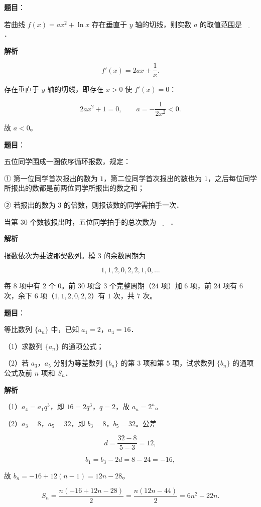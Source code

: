 \begin{answer}

\textbf{题目}：

若曲线 $f(x)=ax^2+\ln x$ 存在垂直于 $y$ 轴的切线，则实数 $a$ 的取值范围是$\underline{\qquad}$．

\textbf{解析}

\nopagebreak[4]
\[f'(x)=2ax+\frac1x.\]

存在垂直于 $y$ 轴的切线，即存在 $x>0$ 使 $f'(x)=0$：

\nopagebreak[4]
\[2ax^2+1=0,\qquad a=-\frac1{2x^2}<0.\]

故 $a<0$。


\end{answer}
\begin{answer}

\textbf{题目}：

五位同学围成一圈依序循环报数，规定：

① 第一位同学首次报出的数为 $1$，第二位同学首次报出的数也为 $1$，之后每位同学所报出的数都是前两位同学所报出的数之和；

② 若报出的数为 $3$ 的倍数，则报该数的同学需拍手一次．

当第 $30$ 个数被报出时，五位同学拍手的总次数为$\underline{\qquad}$．

\textbf{解析}

报数依次为斐波那契数列。模 $3$ 的余数周期为

\nopagebreak[4]
\[1,1,2,0,2,2,1,0,\ldots\]

每 $8$ 项中有 $2$ 个 $0$。前 $30$ 项含 $3$ 个完整周期（$24$ 项）加 $6$ 项，前 $24$ 项有 $6$ 次，余下 $6$ 项（$1,1,2,0,2,2$）有 $1$ 次，共 $7$ 次。


\end{answer}
\begin{answer}

\textbf{题目}：

等比数列 $\{a_n\}$ 中，已知 $a_1=2$，$a_4=16$．

（1）求数列 $\{a_n\}$ 的通项公式；

（2）若 $a_3$，$a_5$ 分别为等差数列 $\{b_n\}$ 的第 $3$ 项和第 $5$ 项，试求数列 $\{b_n\}$ 的通项公式及前 $n$ 项和 $S_n$．

\textbf{解析}

（1）$a_4=a_1q^3$，即 $16=2q^3$，$q=2$，故 $a_n=2^n$。

（2）$a_3=8$，$a_5=32$，即 $b_3=8$，$b_5=32$。公差

\nopagebreak[4]
\[d=\frac{32-8}{5-3}=12,\]

\nopagebreak[4]
\[b_1=b_3-2d=8-24=-16,\]

故 $b_n=-16+12(n-1)=12n-28$。

\nopagebreak[4]
\[S_n=\frac{n(-16+12n-28)}2=\frac{n(12n-44)}2=6n^2-22n.\]


\end{answer}
